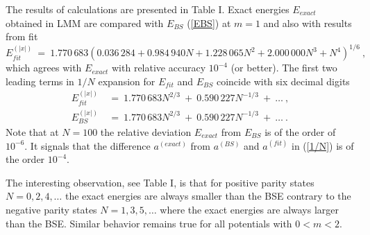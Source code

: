 \documentclass[preprint,preprintnumbers,amsmath,amssymb]{revtex4}
\begin{document}
The results of calculations are presented in Table I. Exact energies $E_{exact}$ obtained in LMM are compared with $E_{BS}$ (\ref{EBS}) at $m=1$ and also with results from fit
\begin{equation}
	E_{fit}^{(|x|)}\ =\ 1.770\,683 \left(0.036\,284 + 0.984\,940 N + 1.228\,065 N^2
                        + 2.000\,000 N^3 + N^4\right)^{1/6} \ ,
\end{equation}
which agrees with $E_{exact}$ with relative accuracy $10^{-4}$ (or better). The first two leading terms in $1/N$ expansion for $E_{fit}$ and $E_{BS}$ coincide with six decimal digits
\begin{align*}
	E_{fit}^{(|x|)}\  &=\  1.770\,683 N^{2/3}\  +\    0.590\,227N^{-1/3}\  + \ \ldots \ ,\\
	E_{BS}^{(|x|)}\ &=\  1.770\,683N^{2/3}\ +\  0.590\,227N^{-1/3}\  + \ \ldots \ .
\end{align*}
Note that at $N=100$ the relative deviation $E_{exact}$ from $E_{BS}$ is of the order of $10^{-6}$. It signals that the difference $a^{(exact)}$ from $a^{(BS)}$ and $a^{(fit)}$ in (\ref{1/N}) is of the order $10^{-4}$.

The interesting observation, see Table I, is that for positive parity states $N=0,2,4,\ldots$ the exact energies are always smaller than the BSE contrary to the negative parity states $N=1,3,5,\ldots$ where the exact energies are always larger than the BSE. Similar behavior remains true for all potentials with $0 < m < 2$.
\end{document}
